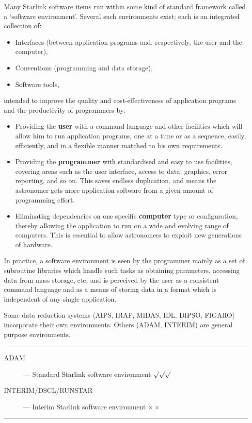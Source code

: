 Many Starlink software items run within some kind of standard framework called
a `software environment'.
Several such environments exist; each is an integrated collection of:
\begin{itemize}
\item Interfaces (between application programs and, respectively, the user and
the computer),
\item Conventions (programming and data storage),
\item Software tools,
\end{itemize}
intended to improve the quality and cost-effectiveness of application programs
and the productivity of programmers by:
\begin{itemize}
\item Providing the {\bf user} with a command language and other facilities
which will allow him to run application programs, one at a time or as a
sequence, easily, efficiently, and in a flexible manner matched to his own
requirements.
\item Providing the {\bf programmer} with standardised and easy to use
facilities, covering areas such as the user interface, access to data, graphics,
error reporting, and so on.
This saves endless duplication, and means the astronomer gets more application
software from a given amount of programming effort.
\item Eliminating dependencies on one specific {\bf computer} type or
configuration, thereby allowing the application to run on a wide and evolving
range of computers.
This is essential to allow astronomers to exploit new generations of
hardware.
\end{itemize}
In practice, a software environment is seen by the programmer mainly as a
set of subroutine libraries which handle such tasks as obtaining parameters,
accessing data from mass storage, etc, and is perceived by the user as a
consistent command language and as a means of storing data in a format which is
independent of any single application.

Some data reduction systems (AIPS, IRAF, MIDAS, IDL, DIPSO, FIGARO) incorporate
their own environments.
Others (ADAM, INTERIM) are general purpose environments.

\rule{\textwidth}{0.5mm}
\begin{description}
\begin{description}
\item [ADAM] --- Standard Starlink software environment \hfill $\surd\surd\surd$
\item [INTERIM/DSCL/RUNSTAR] --- Interim Starlink software environment \hfill
 $\times\times$
\end{description}
\end{description}
\rule{\textwidth}{0.5mm}


